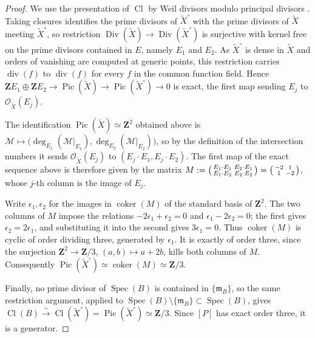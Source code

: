 \documentclass[10pt]{amsart}
\DeclareMathOperator{\Pic}{Pic}
\DeclareMathOperator{\Cl}{Cl}
\DeclareMathOperator{\Spec}{Spec}
\theoremstyle{remark}
\begin{document}
\begin{proof}
	
	
	We use the presentation of \(\Cl\) by Weil divisors modulo principal
	divisors \cite[Tags~0BE2, 0BE3 and~0BE4]{StacksProject}.  Taking closures
	identifies the prime divisors of \(\widetilde X^\circ\) with the prime
	divisors of \(\widetilde X\) meeting \(\widetilde X^\circ\), so
	restriction
	\(\operatorname{Div}(\widetilde X)\to\operatorname{Div}(\widetilde X^\circ)\)
	is surjective with kernel free on the prime divisors contained in \(E\),
	namely \(E_1\) and \(E_2\).  As \(\widetilde X^\circ\) is dense in
	\(\widetilde X\) and orders of vanishing are computed at generic points,
	this restriction carries \(\operatorname{div}(f)\) to
	\(\operatorname{div}(f)\) for every \(f\) in the common function field.
	Hence
	\(\mathbf ZE_1\oplus\mathbf ZE_2\to
	\Pic(\widetilde X)\to\Pic(\widetilde X^\circ)\to0\)
	is exact, the first map sending \(E_j\) to
	\(\mathcal O_{\widetilde X}(E_j)\).
	
	The identification \(\Pic(\widetilde X)\simeq\mathbf Z^2\) obtained above
	is \(\mathcal M\mapsto\bigl(\deg_{E_1}(\mathcal M|_{E_1}),
	\deg_{E_2}(\mathcal M|_{E_2})\bigr)\), so by the definition of the
	intersection numbers it sends \(\mathcal O_{\widetilde X}(E_j)\) to
	\((E_j\cdot E_1,E_j\cdot E_2)\).  The first map of the exact sequence
	above is therefore given by the matrix
	\(M:=\begin{psmallmatrix}
		E_1\cdot E_1&E_2\cdot E_1\\E_1\cdot E_2&E_2\cdot E_2
	\end{psmallmatrix}
	=\begin{psmallmatrix}-2&1\\1&-2\end{psmallmatrix}\),
	whose \(j\)-th column is the image of \(E_j\).
	
	Write \(\epsilon_1,\epsilon_2\) for the images in
	\(\operatorname{coker}(M)\) of the standard basis of \(\mathbf Z^2\).
	The two columns of \(M\) impose the relations
	\(-2\epsilon_1+\epsilon_2=0\) and \(\epsilon_1-2\epsilon_2=0\); the first
	gives \(\epsilon_2=2\epsilon_1\), and substituting it into the second
	gives \(3\epsilon_1=0\).  Thus \(\operatorname{coker}(M)\) is cyclic of
	order dividing three, generated by \(\epsilon_1\).  It is exactly of
	order three, since the surjection \(\mathbf Z^2\to\mathbf Z/3\),
	\((a,b)\mapsto a+2b\), kills both columns of \(M\).  Consequently
	\(\Pic(\widetilde X^\circ)\simeq\operatorname{coker}(M)\simeq\mathbf Z/3\).
	
	Finally, no prime divisor of \(\Spec(B)\) is contained in
	\(\{\mathfrak m_B\}\), so the same restriction argument, applied to
	\(\Spec(B)\setminus\{\mathfrak m_B\}\subset\Spec(B)\), gives
	\(\Cl(B)\xrightarrow{\ \sim\ }\Cl(\widetilde X^\circ)
	=\Pic(\widetilde X^\circ)\simeq\mathbf Z/3\).  Since \([P]\) has exact
	order three, it is a generator.
	

\end{proof}
\end{document}
